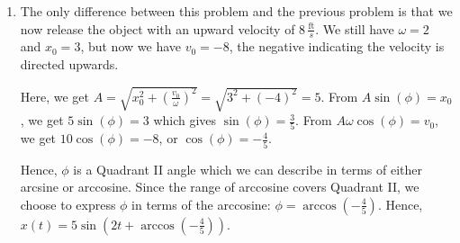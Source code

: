 \documentclass{ximera}
\begin{document}
\begin{example}
\begin{explanation}
\begin{enumerate}
 

To find when the object passes through the equilibrium position we solve $x(t)= 3\sin\left(2t + \frac{\pi}{2}\right) = 0$. Going through the usual analysis we find $t = -\frac{\pi}{4} + \frac{\pi}{2} k$ for integers $k$. Since we are interested in the \textit{first} time the object passes through the equilibrium position, we look for the smallest positive $t$ value which in this case is $t = \frac{\pi}{4} \approx 0.78$ seconds after the  start of the motion.  

 

Common sense suggests that if we release the object \textit{below} the equilibrium position, the object should be traveling \textit{upwards} when it first passes through it.   To check this answer, we graph one cycle of  $x(t)$.  Since our applied domain in this situation is $t \geq 0$, and the period of $x(t)$ is $T = \frac{2\pi}{\omega} = \frac{2\pi}{2} = \pi$, we graph $x(t)$ over the interval $[0,\pi]$.  Remembering that $x(t) > 0$ means the object is below the equilibrium position and $x(t) < 0$ means the object is above the equilibrium position, the fact our graph is crossing through the $t$-axis from positive $x$ to negative $x$ at $t = \frac{\pi}{4}$ confirms our answer.

\begin{center}
\end{center}

\item  The only difference between this problem and the previous problem is that we now release the object with an upward velocity of $8 \, \frac{\text{ft}}{s}$.  We still have $\omega = 2$ and $x_0 = 3$, but now we have $v_0 = -8$, the negative indicating the velocity is directed upwards. 

 

Here, we get $A = \sqrt{x_0^2 + \left( \frac{v_0}{\omega}\right)^2} = \sqrt{3^2 + (-4)^2} = 5$.  From $A\sin(\phi) = x_0$, we get $5\sin(\phi) = 3$ which gives $\sin(\phi) = \frac{3}{5}$.  From  $A\omega\cos(\phi) = v_0$, we get $10\cos(\phi) = -8$, or $\cos(\phi) = -\frac{4}{5}$.  

 

Hence,  $\phi$ is a Quadrant II angle which we can describe in terms of either arcsine or arccosine.  Since the range of arccosine covers Quadrant II, we choose to express $\phi$ in terms of the arccosine:  $\phi = \arccos\left( -\frac{4}{5} \right)$.  Hence, $x(t)= 5 \sin\left(2t + \arccos\left(-\frac{4}{5}\right) \right)$.  


\end{enumerate}
\end{explanation}
\end{example}
\end{document}
